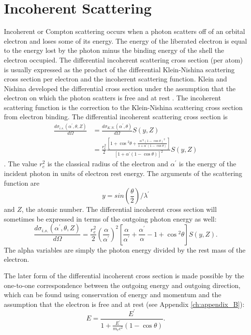 \section{Incoherent Scattering}
\label{sec:incoh_scattering}
Incoherent or Compton scattering occurs when a photon scatters off of an orbital
electron and loses some of its energy. The energy of the liberated electron
is equal to the energy lost by the photon minus the binding energy of the
shell the electron occupied. The differential incoherent scattering cross
section (per atom) is usually expressed as the product of the differential 
Klein-Nishina scattering cross section per electron and the incoherent 
scattering function. Klein and Nishina developed the differential cross section
under the assumption that the electron on which the photon scatters is free 
and at rest \citep{klein_uber_1929}. The incoherent scattering function is the 
correction to the Klein-Nishina scattering cross section from electron binding. 
The differential incoherent scattering cross section is 
\begin{align}
  \frac{d\sigma_{i.s.}(\alpha^{'},\theta,Z)}{d\Omega} & = 
  \frac{d\sigma_{K.N.}(\alpha^{'},\theta)}{d\Omega}S(y,Z) \nonumber \\
  & = \frac{r_e^2}{2}
  \frac{\left[1 + \cos{^{2}\theta} + \frac{\alpha^{'2}(1-\cos{\theta})^2}
                                  {1 + \alpha^{'}(1-\cos{\theta})}\right] }
  {\left[1 + \alpha^{'}(1-\cos{\theta}) \right]^2} S(y,Z)
  \label{eq:incoh_scat_theta}
\end{align}
\citep{lux_monte_1991}. The value $r_e^2$ is the classical radius of the 
electron and $\alpha^{'}$ is the energy of the incident photon in units of 
electron rest energy. The arguments of the scattering function are
\begin{equation}
  y = sin(\frac{\theta}{2})/\lambda^{'}
\end{equation}
and $Z$, the atomic number. The differential incoherent cross section will 
sometimes be expressed in terms of the outgoing photon energy as well: 
\begin{equation}
  \frac{d\sigma_{i.s.}(\alpha^{'},\theta,Z)}{d\Omega} = \frac{r_e^2}{2}
  \left(\frac{\alpha}{\alpha^{'}} \right)^2
  \left[ \frac{\alpha}{\alpha^{'}} + \frac{\alpha^{'}}{\alpha} - 1 + 
    \cos{^2\theta} \right] S(y,Z).
\end{equation}
The alpha variables are simply the photon energy divided by the rest mass of 
the electron.

The later form of the differential incoherent cross section is made possible 
by the one-to-one correspondence between the outgoing energy and outgoing 
direction, which can be found using conservation of energy and momentum and the 
assumption that the electron is free and at rest (see Appendix 
\ref{ch:appendix_B}):
\begin{equation}
  E = \frac{E^{'}}{1 + \frac{E^{'}}{m_ec^2}(1 - \cos{\theta})}.
  \label{eq:compton_scattering_energy_rel}
\end{equation}


